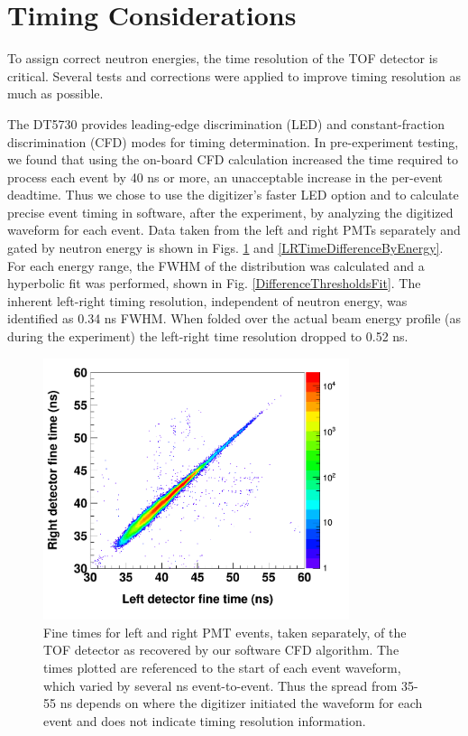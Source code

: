 \section{Timing Considerations}
To assign correct neutron energies, the time resolution of the TOF
detector is critical. Several tests and corrections were applied to improve
timing resolution as much as possible.

The DT5730 provides leading-edge discrimination (\gls{LED}) and constant-fraction discrimination
(\gls{CFD}) modes for timing determination. In pre-experiment testing, we found that using the
on-board CFD calculation increased the time required to process each event by 40
ns or more, an unacceptable increase in the per-event deadtime. Thus we chose
to use the digitizer's faster LED option and to calculate precise event timing
in software, after the experiment, by analyzing the digitized waveform for each event.
Data taken from the left and right PMTs separately and gated by neutron energy 
is shown in Figs. \ref{LRCorrelation} and \ref{LRTimeDifferenceByEnergy}. 
For each energy range, the FWHM of the distribution was calculated and a hyperbolic fit was
performed, shown in Fig. \ref{DifferenceThresholdsFit}. The inherent left-right timing 
resolution, independent of neutron energy, was identified as 0.34 ns FWHM.
When folded over the actual beam energy profile (as during the experiment)
the left-right time resolution dropped to 0.52 ns.

\begin{figure}[tb]
    \centering
    \includegraphics[width=0.8\textwidth]{figures/LRCorrelation.png}
    \caption[Event times for left and right PMTs of time-of-flight detector]
    {Fine times for left and right PMT events, taken separately, of the TOF 
        detector as recovered by our software \gls{CFD} algorithm. The times plotted are referenced
        to the start of each event waveform, which varied by several ns event-to-event.
        Thus the spread from 35-
        55 ns depends on where the digitizer initiated the waveform for each
        event and does not indicate timing resolution information.}
    \label{LRCorrelation}
\end{figure}

